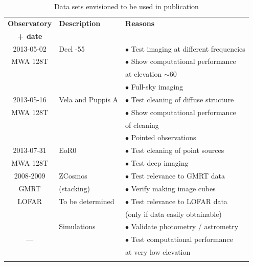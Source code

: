 \documentclass[a4paper,10pt]{article}
\begin{document}
\begin{table}
\caption{Data sets envisioned to be used in publication} \label{tbl:observations}
 \begin{tabular}{|c|l|p{6cm}|}
 \hhline{|=|=|=|}
 \textbf{Observatory} & \textbf{Description} & \textbf{Reasons} \\
 \textbf{+ date} & & \\
 \hhline{|=|=|=|}
  2013-05-02 & Decl -55          & $\bullet$ Test imaging at different frequencies\\
  MWA 128T   &                   & $\bullet$ Show computational performance \\
             &                   & \hspace{5mm} at elevation $\sim 60$\\
             &                   & $\bullet$ Full-sky imaging \\
 \hline
  2013-05-16 & Vela and Puppis A & $\bullet$ Test cleaning of diffuse structure \\
  MWA 128T   &                   & $\bullet$ Show computational performance \\
             &                   & \hspace{5mm} of cleaning\\
             &                   & $\bullet$ Pointed observations \\
 \hline
  2013-07-31 & EoR0              & $\bullet$ Test cleaning of point sources \\
  MWA 128T   &                   & $\bullet$ Test deep imaging \\
 \hline
  2008-2009  & ZCosmos           & $\bullet$ Test relevance to GMRT data \\
  GMRT       & (stacking)        & $\bullet$ Verify making image cubes \\
 \hline
  LOFAR      & To be determined  & $\bullet$ Test relevance to LOFAR data \\
             &                   & (only if data easily obtainable) \\
 \hline
             & Simulations       & $\bullet$ Validate photometry / astrometry \\
   ---       &                   & $\bullet$ Test computational performance \\
             &                   & \hspace{5mm} at very low elevation\\
 \hhline{|=|=|=|}
\end{tabular}
\end{table}

\label{lastpage}



\end{document}
